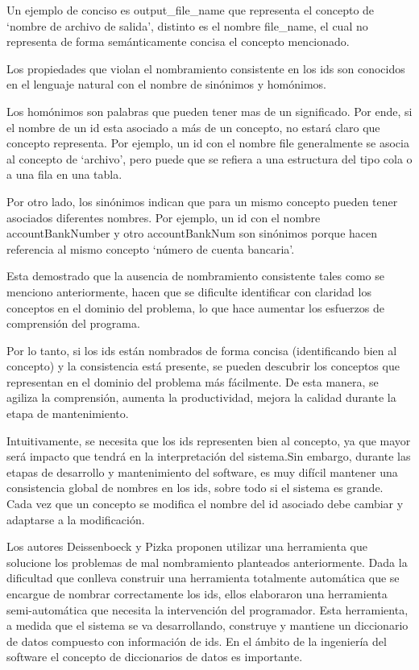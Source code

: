 \documentclass[a4paper,12pt]{report}
\begin{document}
Un ejemplo de conciso es \textsf{output\_file\_name} que representa el concepto de `nombre de archivo de salida', distinto es el nombre \textsf{file\_name}, el cual no representa de forma semánticamente concisa el concepto mencionado.

Los propiedades que violan el nombramiento consistente en los ids son conocidos en el lenguaje natural con el nombre de sinónimos y homónimos. 

Los homónimos son palabras que pueden tener mas de un significado. Por ende, si el nombre de un id esta asociado a más de un concepto, no estará claro que concepto representa. Por ejemplo, un id con el nombre \textsf{file} generalmente se asocia al concepto de `archivo', pero puede que se refiera a una estructura del tipo cola o a una fila en una tabla.

Por otro lado, los sinónimos indican que para un mismo concepto pueden tener asociados diferentes nombres. Por ejemplo, un id con el nombre \mbox{\textsf{accountBankNumber}} y otro \textsf{accountBankNum} son sinónimos porque hacen referencia al mismo concepto `número de cuenta bancaria'. 

Esta demostrado que la ausencia de nombramiento consistente tales como se menciono anteriormente, hacen que se dificulte identificar con claridad los conceptos en el dominio del problema, lo que hace aumentar los esfuerzos de comprensión del programa. 


Por lo tanto, si los ids están nombrados de forma concisa (identificando bien al concepto) y la consistencia está presente, se pueden descubrir los conceptos que representan en el dominio del problema más fácilmente. De esta manera, se agiliza la comprensión, aumenta la productividad, mejora la calidad durante la etapa de mantenimiento\cite{DFPM05,DLHD06}.%

Intuitivamente, se necesita que los ids representen bien al concepto, ya que mayor será impacto que tendrá en la interpretación del sistema\cite{DFPM05,DLHD06}.Sin embargo, durante las etapas de desarrollo y mantenimiento del software, es muy difícil mantener una consistencia global de nombres en los ids, sobre todo si el sistema es grande. Cada vez que un concepto se modifica el nombre del id asociado debe cambiar y adaptarse a la modificación.

Los autores Deissenboeck y Pizka\cite{DFPM05} proponen utilizar una herramienta que solucione los problemas de mal nombramiento planteados anteriormente. Dada la dificultad que conlleva construir una herramienta totalmente automática que se encargue de nombrar correctamente los ids, ellos elaboraron una herramienta semi-automática que necesita la intervención del programador. Esta herramienta, a medida que el sistema se va desarrollando, construye y mantiene un diccionario de datos compuesto con información de ids. En el ámbito de la ingeniería del software el concepto de diccionarios de datos es importante.
\end{document}
